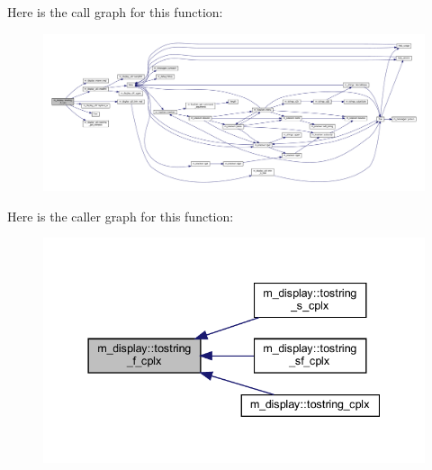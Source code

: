 Here is the call graph for this function\+:
\nopagebreak
\begin{figure}[H]
\begin{center}
\leavevmode
\includegraphics[width=350pt]{namespacem__display_af19de6a6efe76fa3dc9bd86a33f9321b_cgraph}
\end{center}
\end{figure}
Here is the caller graph for this function\+:
\nopagebreak
\begin{figure}[H]
\begin{center}
\leavevmode
\includegraphics[width=337pt]{namespacem__display_af19de6a6efe76fa3dc9bd86a33f9321b_icgraph}
\end{center}
\end{figure}
\mbox{\label{namespacem__display_af82ac5edf2d812767205ea93974885d6}} 
